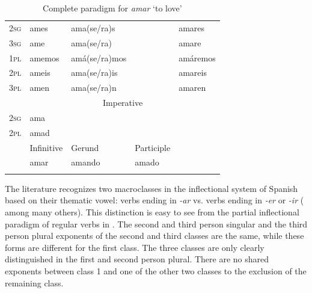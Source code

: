\begin{table}
\begin{tabular}{lllll}
    \textsc{2sg} & ames                & ama(se/ra)s        &                    & amares          \\
    \textsc{3sg} & ame                 & ama(se/ra)         &                    & amare           \\
    \textsc{1pl} & amemos              & amá(se/ra)mos      &                    & amáremos        \\
    \textsc{2pl} & ameis               & ama(se/ra)is       &                    & amareis         \\
    \textsc{3pl} & amen                & ama(se/ra)n        &                    & amaren          \\
    \midrule
        & \multicolumn{4}{c}{Imperative}                                                  \\
    \textsc{2sg} & ama                                                                             \\
    \textsc{2pl} & amad                                                                            \\
    \midrule
        & {Infinitive} & {Gerund}    & {Participle}                  \\
        & amar                & amando             & amado                                \\
    \lspbottomrule
  \end{tabular}\caption{Complete paradigm for \textit{amar} `to love'}\label{tab:conj-sp}
\end{table}

The literature recognizes two macroclasses in the inflectional system of Spanish based on their thematic vowel: verbs ending in \textit{-ar} vs. verbs ending in \textit{-er} or \textit{-ir} (\citealt{Aguirre.2008} among many others). This distinction is easy to see from the partial inflectional paradigm of regular verbs in .
The second and third person singular and the third person plural exponents of the second and third classes are the same, while these forms are different for the first class. The three classes are only clearly distinguished in the first and second person plural. There are no shared exponents between class 1 and one of the other two classes to the exclusion of the remaining class.

